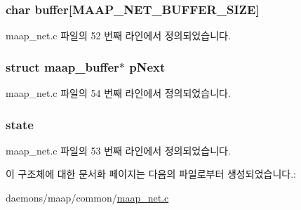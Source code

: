\subsubsection[{\texorpdfstring{buffer}{buffer}}]{\setlength{\rightskip}{0pt plus 5cm}char buffer\mbox{[}{\bf M\+A\+A\+P\+\_\+\+N\+E\+T\+\_\+\+B\+U\+F\+F\+E\+R\+\_\+\+S\+I\+ZE}\mbox{]}}\hypertarget{structmaap__buffer_a9c2256b187e4a46b704abb242b5e3b2e}{}\label{structmaap__buffer_a9c2256b187e4a46b704abb242b5e3b2e}


maap\+\_\+net.\+c 파일의 52 번째 라인에서 정의되었습니다.

\subsubsection[{\texorpdfstring{p\+Next}{pNext}}]{\setlength{\rightskip}{0pt plus 5cm}struct {\bf maap\+\_\+buffer}$\ast$ p\+Next}\hypertarget{structmaap__buffer_a8825d59fa94e1070c0591d6328f1362c}{}\label{structmaap__buffer_a8825d59fa94e1070c0591d6328f1362c}


maap\+\_\+net.\+c 파일의 54 번째 라인에서 정의되었습니다.

\subsubsection[{\texorpdfstring{state}{state}}]{ state}\hypertarget{structmaap__buffer_a34e24239a3e8e82b98201f72b2b592a5}{}\label{structmaap__buffer_a34e24239a3e8e82b98201f72b2b592a5}


maap\+\_\+net.\+c 파일의 53 번째 라인에서 정의되었습니다.



이 구조체에 대한 문서화 페이지는 다음의 파일로부터 생성되었습니다.\+:\begin{DoxyCompactItemize}
\item 
daemons/maap/common/\hyperlink{maap__net_8c}{maap\+\_\+net.\+c}\end{DoxyCompactItemize}
